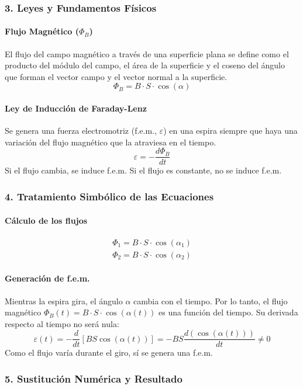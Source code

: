 \subsubsection*{3. Leyes y Fundamentos Físicos}
\paragraph*{Flujo Magnético ($\Phi_B$)}
El flujo del campo magnético a través de una superficie plana se define como el producto del módulo del campo, el área de la superficie y el coseno del ángulo que forman el vector campo y el vector normal a la superficie.
$$ \Phi_B = B \cdot S \cdot \cos(\alpha) $$
\paragraph*{Ley de Inducción de Faraday-Lenz}
Se genera una fuerza electromotriz (f.e.m., $\varepsilon$) en una espira siempre que haya una variación del flujo magnético que la atraviesa en el tiempo.
$$ \varepsilon = -\frac{d\Phi_B}{dt} $$
Si el flujo cambia, se induce f.e.m. Si el flujo es constante, no se induce f.e.m.

\subsubsection*{4. Tratamiento Simbólico de las Ecuaciones}
\paragraph*{Cálculo de los flujos}
\begin{gather}
    \Phi_1 = B \cdot S \cdot \cos(\alpha_1) \\
    \Phi_2 = B \cdot S \cdot \cos(\alpha_2)
\end{gather}
\paragraph*{Generación de f.e.m.}
Mientras la espira gira, el ángulo $\alpha$ cambia con el tiempo. Por lo tanto, el flujo magnético $\Phi_B(t) = B \cdot S \cdot \cos(\alpha(t))$ es una función del tiempo. Su derivada respecto al tiempo no será nula:
$$ \varepsilon(t) = -\frac{d}{dt}[B S \cos(\alpha(t))] = -BS \frac{d(\cos(\alpha(t)))}{dt} \neq 0 $$
Como el flujo varía durante el giro, sí se genera una f.e.m.

\subsubsection*{5. Sustitución Numérica y Resultado}
